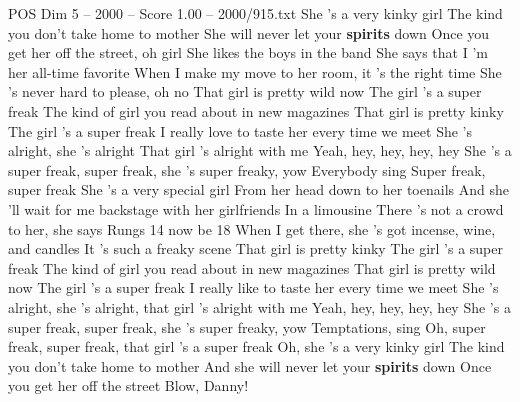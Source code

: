 \begin{textsample}{POS Dim 5 – 2000 – Score 1.00 – 2000/915.txt}  \label{ex:f5_pos_013}
She 's a very kinky girl The kind you don't take home to mother She will never let your \textbf{spirits} down Once you get her off the street, oh girl She likes the boys in the band She says that I 'm her all-time favorite When I make my move to her room, it 's the right time She 's never hard to please, oh no That girl is pretty wild now The girl 's a super freak The kind of girl you read about in new magazines That girl is pretty kinky The girl 's a super freak I really love to taste her every time we meet She 's alright, she 's alright That girl 's alright with me Yeah, hey, hey, hey, hey She 's a super freak, super freak, she 's super freaky, yow Everybody sing Super freak, super freak She 's a very special girl From her head down to her toenails And she 'll wait for me backstage with her girlfriends In a limousine There 's not a crowd to her, she says Rungs 14 now be 18 When I get there, she 's got incense, wine, and candles It 's such a freaky scene That girl is pretty kinky The girl 's a super freak The kind of girl you read about in new magazines That girl is pretty wild now The girl 's a super freak I really like to taste her every time we meet She 's alright, she 's alright, that girl 's alright with me Yeah, hey, hey, hey, hey She 's a super freak, super freak, she 's super freaky, yow Temptations, sing Oh, super freak, super freak, that girl 's a super freak Oh, she 's a very kinky girl The kind you don't take home to mother And she will never let your \textbf{spirits} down Once you get her off the street Blow, Danny!

\end{textsample}
